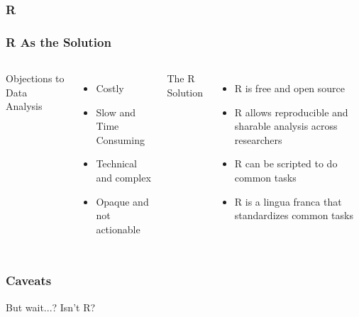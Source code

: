 \documentclass{beamer}
\begin{document}
{
\begin{frame}[plain]
\frametitle{R}
\end{frame}
}


\begin{frame}
\frametitle{R As the Solution}
  \begin{columns}
  Objections to Data Analysis
  \begin{itemize}
  \item Costly
  \item Slow and Time Consuming
  \item Technical and complex
  \item Opaque and not actionable
  \end{itemize}
  The R Solution
  \begin{itemize}
  \item R is free and open source
  \item R allows reproducible and sharable analysis across researchers
  \item R can be scripted to do common tasks
  \item R is a lingua franca that standardizes common tasks
  \end{itemize}
  \end{columns}
\end{frame}


\begin{frame}
\frametitle{Caveats}
\begin{center}
\Large But wait...? Isn't R?
\end{center}
\end{frame}
\end{document}
